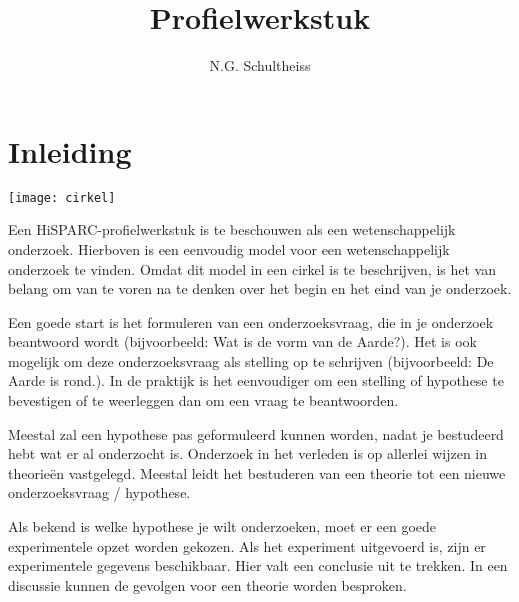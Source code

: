 



\title{Profielwerkstuk}
\author{N.G. Schultheiss}
\date{}

\maketitle
\thispagestyle{firststyle}

\section{Inleiding}

\noindent \begin{center}
\texttt{[image: cirkel]}
\par\end{center}

Een HiSPARC-profielwerkstuk is te beschouwen als een wetenschappelijk
onderzoek. Hierboven is een eenvoudig model voor een wetenschappelijk
onderzoek te vinden. Omdat dit model in een cirkel is te beschrijven,
is het van belang om van te voren na te denken over het begin en het
eind van je onderzoek.

Een goede start is het formuleren van een onderzoeksvraag, die in
je onderzoek beantwoord wordt (bijvoorbeeld: Wat is de vorm van de
Aarde?). Het is ook mogelijk om deze onderzoeksvraag als stelling
op te schrijven (bijvoorbeeld: De Aarde is rond.). In de praktijk
is het eenvoudiger om een stelling of hypothese te bevestigen of te
weerleggen dan om een vraag te beantwoorden.

Meestal zal een hypothese pas geformuleerd kunnen worden, nadat je
bestudeerd hebt wat er al onderzocht is. Onderzoek in het verleden
is op allerlei wijzen in theorieën vastgelegd. Meestal leidt het bestuderen
van een theorie tot een nieuwe onderzoeksvraag / hypothese.

Als bekend is welke hypothese je wilt onderzoeken, moet er een goede
experimentele opzet worden gekozen. Als het experiment uitgevoerd
is, zijn er experimentele gegevens beschikbaar. Hier valt een conclusie
uit te trekken. In een discussie kunnen de gevolgen voor een theorie
worden besproken.


